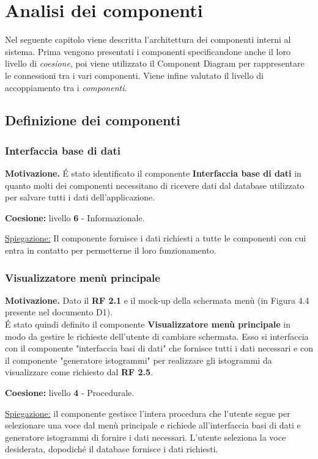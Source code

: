 \chapter{Analisi dei componenti}
Nel seguente capitolo viene descritta l'architettura dei componenti interni al sistema. Prima vengono presentati i componenti specificandone anche il loro livello di \textit{coesione}, poi viene utilizzato il Component Diagram per rappresentare le connessioni tra i vari componenti. Viene infine valutato il livello di accoppiamento tra i \textit{componenti}.

\section{Definizione dei componenti}

\subsection{Interfaccia base di dati}
\textbf{Motivazione.} \'E stato identificato il componente \textbf{Interfaccia base di dati} in quanto molti dei componenti necessitano di ricevere dati dal database utilizzato per salvare tutti i dati dell'applicazione.

\vspace{5mm}
\noindent
\textbf{Coesione:} livello \textbf{6} - Informazionale. 

\noindent
\underline{Spiegazione:} Il componente fornisce i dati richiesti a tutte le componenti con cui entra in contatto per permetterne il loro funzionamento.

\subsection{Visualizzatore menù principale}
\textbf{Motivazione.} Dato il \textbf{RF 2.1} e il mock-up della schermata menù (in Figura 4.4 presente nel documento D1).\\
\'E stato quindi definito il componente \textbf{Visualizzatore menù principale} in modo da gestire le richieste dell'utente di cambiare schermata. Esso si interfaccia con il componente "interfaccia basi di dati" che fornisce tutti i dati necessari e con il componente "generatore istogrammi" per realizzare gli istogrammi da visualizzare come richiesto dal \textbf{RF 2.5}.

\vspace{5mm}
\noindent
\textbf{Coesione:} livello \textbf{4} - Procedurale. 

\noindent
\underline{Spiegazione:} il componente gestisce l'intera procedura che l'utente segue per selezionare una voce dal menù principale e richiede all'interfaccia basi di dati e generatore istogrammi di fornire i dati necessari. L'utente seleziona la voce desiderata, dopodiché il database fornisce i dati richiesti.

